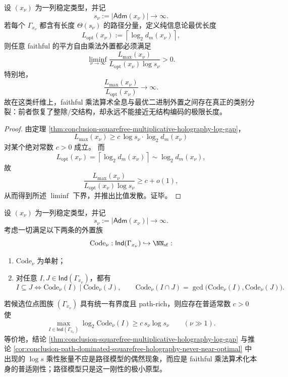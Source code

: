 \begin{corollary}\label{cor:conclusion-path-dominated-squarefree-holography-never-near-optimal}
设 \((x_\nu)\) 为一列稳定类型，并记
\[
s_\nu:=|\mathsf{Adm}(x_\nu)|\longrightarrow\infty.
\]
若每个 \(\Gamma_{x_\nu}\) 都含有长度 \(\Theta(s_\nu)\) 的路径分量，定义纯信息论最优长度
\[
L_{\mathrm{opt}}(x_\nu):=\left\lceil\log_2 d_m(x_\nu)\right\rceil,
\]
则任意 faithful 的平方自由乘法外置都必须满足
\[
\liminf_{\nu\to\infty}
\frac{L_{\max}(x_\nu)}{L_{\mathrm{opt}}(x_\nu)\log s_\nu}>0.
\]
特别地，
\[
\frac{L_{\max}(x_\nu)}{L_{\mathrm{opt}}(x_\nu)}\longrightarrow\infty.
\]
故在这类纤维上，faithful 乘法算术全息与最优二进制外置之间存在真正的类别分裂：前者恢复了整除/交结构，却永远不能接近无结构编码的极限长度。
\end{corollary}
\begin{proof}
由定理 \ref{thm:conclusion-squarefree-multiplicative-holography-log-gap}，
\[
L_{\max}(x_\nu)\ge c\,\log s_\nu\cdot \log_2 d_m(x_\nu)
\]
对某个绝对常数 \(c>0\) 成立。
而
\[
L_{\mathrm{opt}}(x_\nu)=\left\lceil\log_2 d_m(x_\nu)\right\rceil
\sim \log_2 d_m(x_\nu),
\]
故
\[
\frac{L_{\max}(x_\nu)}{L_{\mathrm{opt}}(x_\nu)\log s_\nu}\ge c+o(1),
\]
从而得到所述 \(\liminf\) 下界，并推出比值发散。证毕。
\end{proof}

\begin{conjecture}\label{conj:conclusion-squarefree-faithful-multiplicative-holography-universal-log-gap}
设 \((x_\nu)\) 为一列稳定类型，并记
\[
s_\nu:=|\mathsf{Adm}(x_\nu)|\to\infty.
\]
考虑一切满足以下两条的外置族
\[
\mathrm{Code}_\nu:\mathsf{Ind}(\Gamma_{x_\nu})\hookrightarrow \NN_{\mathrm{sf}}:
\]
\begin{enumerate}
  \item \(\mathrm{Code}_\nu\) 为单射；
  \item 对任意 \(I,J\in\mathsf{Ind}(\Gamma_{x_\nu})\)，都有
  \[
  I\subseteq J
  \iff
  \mathrm{Code}_\nu(I)\mid \mathrm{Code}_\nu(J),
  \qquad
  \mathrm{Code}_\nu(I\cap J)=\gcd\bigl(\mathrm{Code}_\nu(I),\mathrm{Code}_\nu(J)\bigr).
  \]
\end{enumerate}
若候选位点图族 \((\Gamma_{x_\nu})\) 具有统一有界度且 path-rich，则应存在普适常数 \(c>0\) 使
\[
\max_{I\in\mathsf{Ind}(\Gamma_{x_\nu})}\log_2\mathrm{Code}_\nu(I)
\ge
c\,s_\nu\log s_\nu
\qquad (\nu\gg 1).
\]
等价地，结论 \ref{thm:conclusion-squarefree-multiplicative-holography-log-gap} 与推论 \ref{cor:conclusion-path-dominated-squarefree-holography-never-near-optimal} 中出现的 \(\log s\) 乘性胀量不应是路径模型的偶然现象，而应是 faithful 乘法算术化本身的普适刚性；路径模型只是这一刚性的极小原型。
\end{conjecture}
